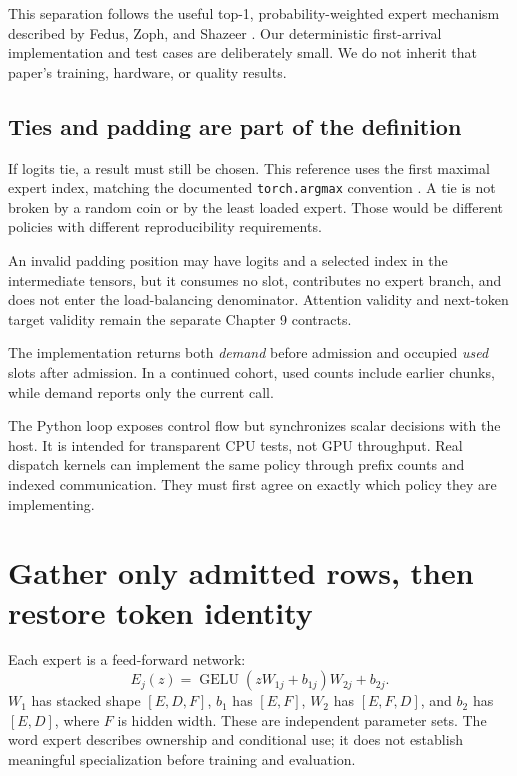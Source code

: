 This separation follows the useful top-1, probability-weighted expert mechanism
described by Fedus, Zoph, and Shazeer \cite{switch}. Our deterministic
first-arrival implementation and test cases are deliberately small. We do not
inherit that paper's training, hardware, or quality results.

\begin{center}\end{center}

\subsection{Ties and padding are part of the definition}
If logits tie, a result must still be chosen. This reference uses the first
maximal expert index, matching the documented \texttt{torch.argmax} convention
\cite{argmax}. A tie is not broken by a random coin or by the least loaded
expert. Those would be different policies with different reproducibility
requirements.

An invalid padding position may have logits and a selected index in the
intermediate tensors, but it consumes no slot, contributes no expert branch,
and does not enter the load-balancing denominator. Attention validity and
next-token target validity remain the separate Chapter 9 contracts.

The implementation returns both \emph{demand} before admission and occupied
\emph{used} slots after admission. In a continued cohort, used counts include
earlier chunks, while demand reports only the current call.

The Python loop exposes control flow but synchronizes scalar decisions with the
host. It is intended for transparent CPU tests, not GPU throughput. Real
dispatch kernels can implement the same policy through prefix counts and
indexed communication. They must first agree on exactly which policy they are
implementing.

\section{Gather only admitted rows, then restore token identity}
Each expert is a feed-forward network:
\begin{equation}
E_j(z)=\operatorname{GELU}(zW_{1j}+b_{1j})W_{2j}+b_{2j}.
\end{equation}
$W_1$ has stacked shape $[E,D,F]$, $b_1$ has $[E,F]$, $W_2$ has $[E,F,D]$,
and $b_2$ has $[E,D]$, where $F$ is hidden width. These are independent
parameter sets. The word expert describes ownership and conditional use; it
does not establish meaningful specialization before training and evaluation.

